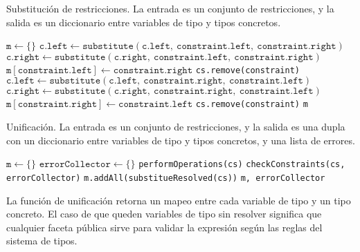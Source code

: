 \begin{algorithm}\captionsetup{labelsep=newline}
  \centering
  \caption{Substitución de restricciones. La entrada es un conjunto de restricciones, y la salida es un diccionario entre variables de tipo y tipos concretos.}
  \label{pseudosubst}
    \begin{algorithmic}[1]
          \State $\mathtt{m\gets \{\}}$
                \State $\mathtt{c.left\gets substitute(c.left,\ constraint.left,\ constraint.right)}$
                \State $\mathtt{c.right\gets substitute(c.right,\ constraint.left,\ constraint.right)}$
              \EndFor
              \State $\mathtt{m[constraint.left]\gets constraint.right}$
              \State \texttt{cs.remove(constraint)}
            \EndIf
                \State $\mathtt{c.left\gets substitute(c.left,\ constraint.right,\ constraint.left)}$
                \State $\mathtt{c.right\gets substitute(c.right,\ constraint.right,\ constraint.left)}$
              \EndFor
              \State $\mathtt{m[constraint.right]\gets constraint.left}$
              \State \texttt{cs.remove(constraint)}
            \EndIf
          \EndFor
          \State \Return \texttt{m}
      \EndFunction
    \end{algorithmic}
\end{algorithm}
\clearpage
\begin{algorithm}\captionsetup{labelsep=newline}
  \centering
  \caption{Unificación. La entrada es un conjunto de restricciones, y la salida es una dupla con un diccionario entre variables de tipo y tipos concretos, y una lista de errores.}
  \label{pseudouni}
    \begin{algorithmic}[1]
          \State $\mathtt{m\gets \{\}}$
          \State $\mathtt{errorCollector\gets \{\}}$
            \State \texttt{performOperations(cs)}
            \State \texttt{checkConstraints(cs, errorCollector)}
            \State \texttt{m.addAll(substitueResolved(cs))}
          \EndWhile
          \State \Return \texttt{m, errorCollector}
      \EndFunction
    \end{algorithmic}
\end{algorithm}
La función de unificación retorna un mapeo entre cada variable de tipo y un tipo concreto. El caso de que queden variables de tipo sin resolver significa que cualquier faceta pública sirve para validar la expresión según las reglas del sistema de tipos.

